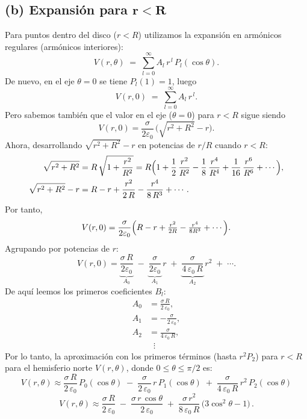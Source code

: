 \documentclass[12pt]{article}
\begin{document}
\subsection*{(b) Expansión para \(\boldsymbol{r<R}\)}

Para puntos dentro del disco (\(r<R\)) utilizamos la expansión en armónicos regulares (armónicos interiores):
\[
V(r,\theta)
\;=\;
\sum_{l=0}^{\infty} A_{l}\,r^{\,l}\,P_{l}(\cos\theta).
\]
De nuevo, en el eje \(\theta=0\) se tiene \(P_{l}(1) = 1\), luego
\[
V(r,0) \;=\; \sum_{l=0}^{\infty} A_{l}\,r^{\,l}.
\]
Pero sabemos también que el valor en el eje (\(\theta=0\)) para \(r<R\) sigue siendo
\[
V(r,0) 
= \frac{\sigma}{2\varepsilon_{0}}\,\bigl(\sqrt{r^{2}+R^{2}} - r\bigr).
\]
Ahora, desarrollando \(\sqrt{r^{2}+R^{2}} - r\) en potencias de \(r/R\) cuando \(r<R\):
\begin{align*}
\sqrt{r^{2} + R^{2}}
&= R\,\sqrt{1 + \frac{r^{2}}{R^{2}}}
= R \Bigl( 1 + \frac{1}{2}\,\frac{r^{2}}{R^{2}} - \frac{1}{8}\,\frac{r^{4}}{R^{4}} 
      + \frac{1}{16}\,\frac{r^{6}}{R^{6}} + \cdots \Bigr),\\
%
\sqrt{r^{2} + R^{2}} - r
&= R - r + \frac{r^{2}}{2\,R} - \frac{r^{4}}{8\,R^{3}} + \cdots.
\end{align*}
Por tanto,
\[
V(r,0)
= \frac{\sigma}{2\varepsilon_{0}} 
  \Bigl(R - r + \tfrac{r^{2}}{2R} - \tfrac{r^{4}}{8R^{3}} + \cdots \Bigr).
\]
Agrupando por potencias de \(r\):
\[
V(r,0)
= \underbrace{\frac{\sigma\,R}{2\varepsilon_{0}}}_{A_{0}} 
  \;-\; \underbrace{\frac{\sigma}{2\varepsilon_{0}}}_{A_{1}}\,r 
  \;+\; \underbrace{\frac{\sigma}{4\,\varepsilon_{0}\,R}}_{A_{2}}\,r^{2} 
  \;+\; \cdots.
\]
De aquí leemos los primeros coeficientes \(B_{l}\):
\[
\begin{aligned}
A_{0} &= \frac{\sigma\,R}{2\,\varepsilon_{0}}, \\[6pt]
A_{1} &= -\frac{\sigma}{2\,\varepsilon_{0}}, \\[6pt]
A_{2} &= \frac{\sigma}{4\,\varepsilon_{0}\,R}, \\[6pt]
&\;\;\vdots
\end{aligned}
\]
Por lo tanto, la aproximación con los primeros términos (hasta \(r^{2}P_{2}\)) para \(r<R\) para el hemisferio norte \(V(r,\theta)\), donde \(0 \le\theta\le\pi/2\)  es:
\[
V(r,\theta)
\approx
\frac{\sigma\,R}{2\,\varepsilon_{0}}\,P_{0}(\cos\theta)
\;-\; \frac{\sigma}{2\,\varepsilon_{0}}\,r\,P_{1}(\cos\theta)
\;+\; \frac{\sigma}{4\,\varepsilon_{0}\,R}\,r^{2}\,P_{2}(\cos\theta)
\]
\[
V(r,\theta)\approx
\frac{\sigma\,R}{2\,\varepsilon_{0}}
\;-\;
\frac{\sigma\,r\,\cos\theta}{2\,\varepsilon_{0}}
\;+\;
\frac{\sigma\,r^{2}}{8\,\varepsilon_{0}\,R}\,\bigl(3\cos^{2}\theta - 1\bigr)\,.
\]
\end{document}
